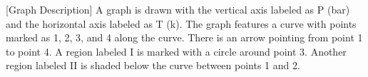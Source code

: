 [Graph Description]
A graph is drawn with the vertical axis labeled as P (bar) and the horizontal axis labeled as T (k). The graph features a curve with points marked as 1, 2, 3, and 4 along the curve. There is an arrow pointing from point 1 to point 4. A region labeled I is marked with a circle around point 3. Another region labeled II is shaded below the curve between points 1 and 2.